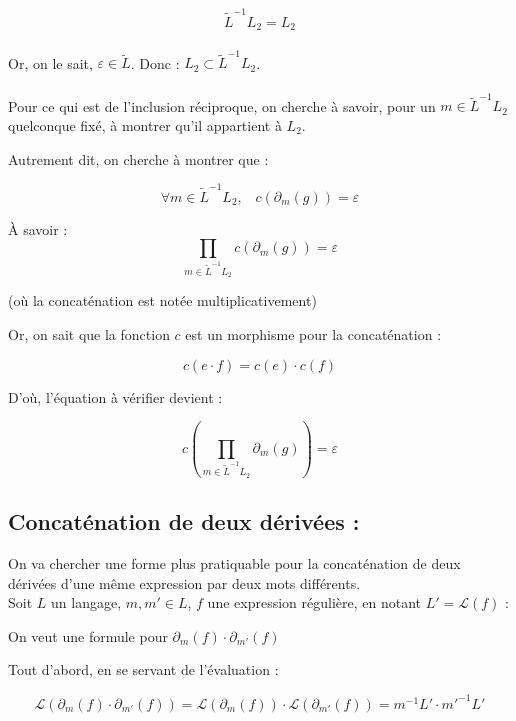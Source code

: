 \documentclass{article}
\begin{document}
$$\tilde{L}^{-1}L_2=L_2$$
\\
Or, on le sait, $\varepsilon \in \tilde{L}$. Donc : $L_2 \subset \tilde{L}^{-1}L_2$.
\\
\\
Pour ce qui est de l'inclusion réciproque, on cherche à savoir, pour un $m \in \tilde{L}^{-1}L_2$ quelconque fixé, à montrer qu'il appartient à $L_2$.

Autrement dit, on cherche à montrer que :

$$\forall m \in \tilde{L}^{-1}L_2, \;\;\; c(\partial_m(g)) = \varepsilon$$


À savoir : $$\prod_{m \in \tilde{L}^{-1}L_2} c(\partial_m(g)) = \varepsilon$$

(où la concaténation est notée multiplicativement)

Or, on sait que la fonction $c$ est un morphisme pour la concaténation :

$$c(e\cdot f) = c(e) \cdot c(f)$$

D'où, l'équation à vérifier devient :

$$c \left ( \prod_{m \in \tilde{L}^{-1}L_2} \partial_m(g) \right ) = \varepsilon $$

\subsection{Concaténation de deux dérivées :}

On va chercher une forme plus pratiquable pour la concaténation de deux dérivées d'une même expression par deux mots différents.
\\
Soit $L$ un langage, $m,m' \in L$, $f$ une expression régulière, en notant $L' = \mathcal{L}(f)$ :

On veut une formule pour $\partial_m(f) \cdot \partial_{m'}(f)$

Tout d'abord, en se servant de l'évaluation :

$$\mathcal{L}(\partial_m(f) \cdot \partial_{m'}(f))=\mathcal{L}(\partial_m(f))\cdot\mathcal{L}(\partial_{m'}(f))=m^{-1}L' \cdot m'^{-1}L'$$
\end{document}
